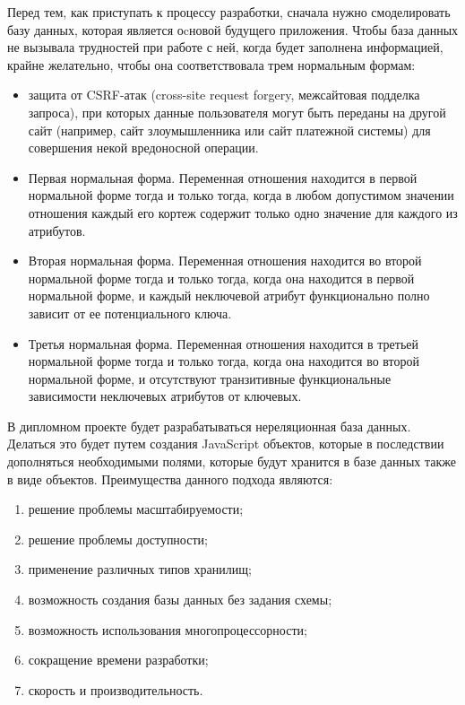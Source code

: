 Перед тем, как приступать к процессу разработки, сначала нужно смоделировать базу данных, которая является оcновой будущего приложения. Чтобы база данных не вызывала трудностей при работе с ней, когда будет заполнена информацией, крайне желательно, чтобы она соответствовала трем нормальным формам:
\begin{itemize}
  \item защита от CSRF-атак (cross-site request forgery, межсайтовая подделка запроса), при которых данные пользователя могут быть переданы на другой сайт (например, сайт злоумышленника или сайт платежной системы) для совершения некой вредоносной операции.
  \item Первая нормальная форма. Переменная отношения находится в первой нормальной форме тогда и только тогда, когда в любом допустимом значении отношения каждый его кортеж содержит только одно значение для каждого из атрибутов. 
  \item Вторая нормальная форма. Переменная отношения находится во второй нормальной форме тогда и только тогда, когда она находится в первой нормальной форме, и каждый неключевой атрибут функционально полно зависит от ее потенциального ключа.
  \item Третья нормальная форма. Переменная отношения находится в третьей нормальной форме тогда и только тогда, когда она находится во второй нормальной форме, и отсутствуют транзитивные функциональные зависимости неключевых атрибутов от ключевых.
\end{itemize}

В дипломном проекте будет разрабатываться нереляционная база данных. Делаться это будет путем создания JavaScript объектов, которые в последствии дополняться необходимыми полями, которые будут хранится в базе данных также в виде объектов. Преимущества данного подхода являются: 
\begin{enumerate}
  \item решение проблемы масштабируемости;
  \item решение проблемы доступности;
  \item применение различных типов хранилищ;
  \item возможность создания базы данных без задания схемы;
  \item возможность использования многопроцессорности;
  \item сокращение времени разработки;
  \item скорость и производительность.
\end{enumerate}

